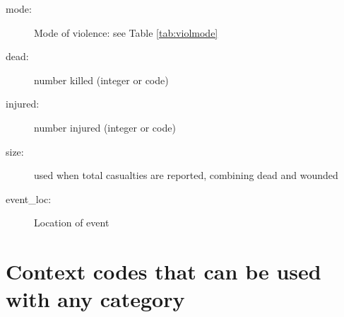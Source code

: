 \documentclass[11pt]{report}
\begin{document}
\begin{description}
	\item[mode:] Mode of violence: see Table \ref{tab:violmode} 
	\item[dead:]  number killed (integer or code) 
	\item[injured:] number injured (integer or code) 
	\item[size:] used when total casualties are reported, combining dead and wounded 
	\item[event\_loc:] Location of event 
\end{description}



\section{Context codes that can be used with any category}
\end{document}
